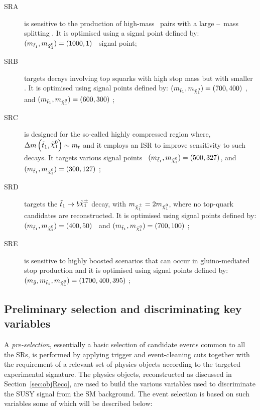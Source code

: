 		\begin{description}
			\item [SRA] is sensitive to the production of high-mass \stop\ pairs with a large \stop--\ninoone\ mass splitting \dmstopnino. It is optimised using a signal point defined by: $(\mstopone, \mninoone) = (1000,1)$ \GeV\ signal point;
			
			\item [SRB] targets decays involving top squarks with high stop mass but with smaller \dmstopnino. It is optimised using signal points defined by:  $(\mstopone, \mninoone) = (700, 400)$ \GeV, and $(\mstopone, \mninoone) = (600, 300)$ \GeV;
			
			\item [SRC] is designed for the so-called highly compressed region where, $\dmstopnino \sim m_t$ and it employs an \ac{ISR} to improve sensitivity to such decays. It targets various signal points \eg\ $(\mstopone, \mninoone) = (500, 327)$, and $(\mstopone, \mninoone) = (300, 127)$ \GeV; 
			
			\item [SRD] targets the $\stopone \to b \chinoonepm$ decay, with $\mchinoonepm = 2\mninoone$, where no top-quark candidates are reconstructed. It is optimised using signal points defined by: $(\mstopone, \mninoone) = (400,50)$ \GeV\ and $(\mstopone, \mninoone) = (700,100)$ \GeV; 
			
			\item [SRE] is sensitive to highly boosted scenarios that can occur in gluino-mediated stop production and it is optimised using signal points defined by: $(\mgluino, \mstopone, \mninoone) = (1700, 400, 395)$ \GeV;
		\end{description}

		\subsection{Preliminary selection and discriminating key variables}
		\label{sec:vars_used}

			A \emph{pre-selection}, essentially a basic selection of candidate events common to all the \acp{SR}, is performed by applying trigger and event-cleaning cuts together with the requirement of a relevant set of physics objects according to the targeted experimental signature. The physics objects, reconstructed as discussed in Section~\ref{sec:objReco}, are used to build the various variables used to discriminate the \ac{SUSY} signal from the \ac{SM} background. The event selection is based on such variables some of which will be described below:

